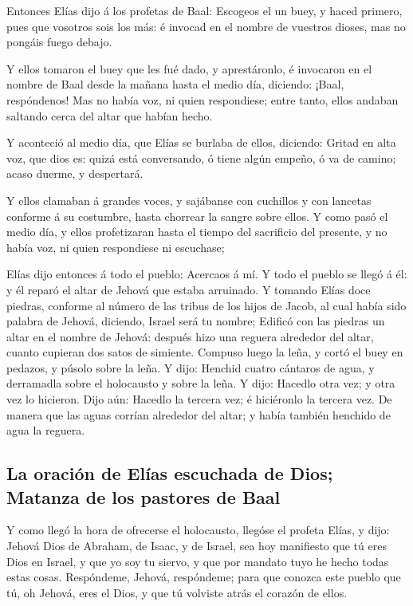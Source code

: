  Entonces Elías dijo á los profetas de Baal: Escogeos el
un buey, y haced primero, pues que vosotros sois los más: é invocad en
el nombre de vuestros dioses, mas no pongáis fuego debajo.

 Y ellos tomaron el buey que les fué dado, y
aprestáronlo, é invocaron en el nombre de Baal desde la mañana hasta el
medio día, diciendo: ¡Baal, respóndenos! Mas no había voz, ni quien
respondiese; entre tanto, ellos andaban saltando cerca del altar que
habían hecho.

 Y aconteció al medio día, que Elías se burlaba de ellos,
diciendo: Gritad en alta voz, que dios es: quizá está conversando, ó
tiene algún empeño, ó va de camino; acaso duerme, y despertará.

 Y ellos clamaban á grandes voces, y sajábanse con
cuchillos y con lancetas conforme á su costumbre, hasta chorrear la
sangre sobre ellos.  Y como pasó el medio día, y ellos
profetizaran hasta el tiempo del sacrificio del presente, y no había
voz, ni quien respondiese ni escuchase;

 Elías dijo entonces á todo el pueblo: Acercaos á mí. Y
todo el pueblo se llegó á él: y él reparó el altar de Jehová que estaba
arruinado.  Y tomando Elías doce piedras, conforme al
número de las tribus de los hijos de Jacob, al cual había sido palabra
de Jehová, diciendo, Israel será tu nombre;  Edificó con
las piedras un altar en el nombre de Jehová: después hizo una reguera
alrededor del altar, cuanto cupieran dos satos de simiente.
 Compuso luego la leña, y cortó el buey en pedazos, y
púsolo sobre la leña.  Y dijo: Henchid cuatro cántaros de
agua, y derramadla sobre el holocausto y sobre la leña. Y dijo: Hacedlo
otra vez; y otra vez lo hicieron. Dijo aún: Hacedlo la tercera vez; é
hiciéronlo la tercera vez.  De manera que las aguas
corrían alrededor del altar; y había también henchido de agua la
reguera.

\hypertarget{la-oraciuxf3n-de-eluxedas-escuchada-de-dios-matanza-de-los-pastores-de-baal}{%
\subsection{La oración de Elías escuchada de Dios; Matanza de los
pastores de
Baal}\label{la-oraciuxf3n-de-eluxedas-escuchada-de-dios-matanza-de-los-pastores-de-baal}}

 Y como llegó la hora de ofrecerse el holocausto, llegóse
el profeta Elías, y dijo: Jehová Dios de Abraham, de Isaac, y de Israel,
sea hoy manifiesto que tú eres Dios en Israel, y que yo soy tu siervo, y
que por mandato tuyo he hecho todas estas cosas. 
Respóndeme, Jehová, respóndeme; para que conozca este pueblo que tú, oh
Jehová, eres el Dios, y que tú volviste atrás el corazón de ellos.

